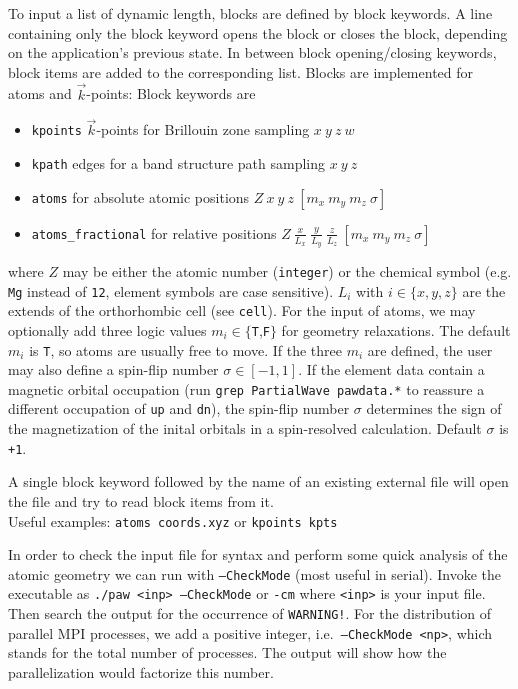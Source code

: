 \documentclass[12pt,BCOR8mm,noappendixprefix,nochapterprefix,bibtotoc,idxtotoc,openbib,tablecaptionabove]{scrbook}
\newcommand{\ttt}[1]{\texttt{#1}}
\begin{document}
To input a list of dynamic length, blocks are defined by block keywords. 
A line containing only the block keyword opens the block or closes the block, 
depending on the application's previous state. In between block opening/closing keywords, 
block items are added to the corresponding list. 
Blocks are implemented for atoms and $\vec k$-points: Block keywords are
\begin{itemize}
 \item \ttt{kpoints} $\vec k$-points for Brillouin zone sampling $x \ y \ z \ w$
 \item \ttt{kpath} edges for a band structure path sampling $x \ y \ z$
 \item \ttt{atoms} for absolute atomic positions $Z \ x \ y \ z \ [m_x \ m_y \ m_z \ \sigma]$
 \item \ttt{atoms\_fractional} for relative positions $Z \ \frac{x}{L_x} \ \frac{y}{L_y} \ \frac{z}{L_z} \ [m_x \ m_y \ m_z \ \sigma]$
\end{itemize}
where $Z$ may be either the atomic number (\ttt{integer}) or the 
chemical symbol (e.g. \ttt{Mg} instead of \ttt{12}, element symbols are case sensitive). 
$L_i$ with $i \in \{x,y,z\}$ are the extends of the orthorhombic cell (see \ttt{cell}). 
For the input of atoms, we may optionally add three logic values $m_i \in \{$\ttt{T},\ttt{F}$\}$ for geometry relaxations. 
The default $m_i$ is \ttt{T}, so atoms are usually free to move. 
If the three $m_i$ are defined, the user may also define a spin-flip number $\sigma \in [-1,1]$. If the element data contain 
a magnetic orbital occupation (run \ttt{grep PartialWave pawdata.*} to reassure a different occupation of \ttt{up} and \ttt{dn}), 
the spin-flip number $\sigma$ determines the sign of the magnetization of the inital orbitals in a spin-resolved calculation. 
Default $\sigma$ is \ttt{+1}.

A single block keyword followed by the name of an existing external file will open the file 
and try to read block items from it.\\
Useful examples: \ttt{atoms coords.xyz} or \ttt{kpoints kpts}

In order to check the input file for syntax and perform some quick analysis of the atomic geometry 
we can run with \ttt{--CheckMode} (most useful in serial). 
Invoke the executable as \ttt{./paw <inp> --CheckMode} or \ttt{-cm} where \ttt{<inp>} is your input file. 
Then search the output for the occurrence of \ttt{WARNING!}. For the distribution of parallel MPI processes, 
we add a positive integer, i.e.~\ttt{--CheckMode <np>}, which stands for the total number of processes. 
The output will show how the parallelization would factorize this number.
\end{document}
